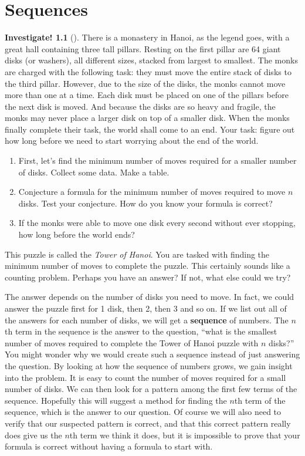 \documentclass[10pt,]{book}
\newcommand{\terminology}[1]{\textbf{#1}}
\theoremstyle{plain}
\theoremstyle{definition}
\theoremstyle{definition}
\theoremstyle{definition}
\newtheorem{investigation}[project]{Investigate!}
\theoremstyle{definition}
\numberwithin{equation}{chapter}
\begin{document}
\chapter[{Sequences}]{Sequences}\label{ch_sequences}
\begin{investigation}[]\label{investigation-1}
\hypertarget{p-19}{}%
There is a monastery in Hanoi, as the legend goes, with a great hall containing three tall pillars. Resting on the first pillar are 64 giant disks (or washers), all different sizes, stacked from largest to smallest. The monks are charged with the following task: they must move the entire stack of disks to the third pillar. However, due to the size of the disks, the monks cannot move more than one at a time. Each disk must be placed on one of the pillars before the next disk is moved. And because the disks are so heavy and fragile, the monks may never place a larger disk on top of a smaller disk. When the monks finally complete their task, the world shall come to an end. Your task: figure out how long before we need to start worrying about the end of the world. %
\begin{enumerate}
\item\hypertarget{li-5}{}\hypertarget{p-20}{}%
First, let's find the minimum number of moves required for a smaller number of disks. Collect some data. Make a table.%
\item\hypertarget{li-6}{}\hypertarget{p-21}{}%
Conjecture a formula for the minimum number of moves required to move \(n\) disks. Test your conjecture. How do you know your formula is correct?%
\item\hypertarget{li-7}{}\hypertarget{p-22}{}%
If the monks were able to move one disk every second without ever stopping, how long before the world ends?%
\end{enumerate}
%
\end{investigation}
\hypertarget{p-23}{}%
This puzzle is called the \emph{Tower of Hanoi}. You are tasked with finding the minimum number of moves to complete the puzzle. This certainly sounds like a counting problem. Perhaps you have an answer? If not, what else could we try?%
\par
\hypertarget{p-24}{}%
The answer depends on the number of disks you need to move. In fact, we could answer the puzzle first for 1 disk, then 2, then 3 and so on. If we list out all of the answers for each number of disks, we will get a \terminology{sequence} of numbers. The \(n\)th term in the sequence is the answer to the question, ``what is the smallest number of moves required to complete the Tower of Hanoi puzzle with \(n\) disks?'' You might wonder why we would create such a sequence instead of just answering the question. By looking at how the sequence of numbers grows, we gain insight into the problem. It is easy to count the number of moves required for a small number of disks. We can then look for a pattern among the first few terms of the sequence. Hopefully this will suggest a method for finding the \(n\)th term of the sequence, which is the answer to our question. Of course we will also need to verify that our suspected pattern is correct, and that this correct pattern really does give us the \(n\)th term we think it does, but it is impossible to prove that your formula is correct without having a formula to start with.%
\end{document}
